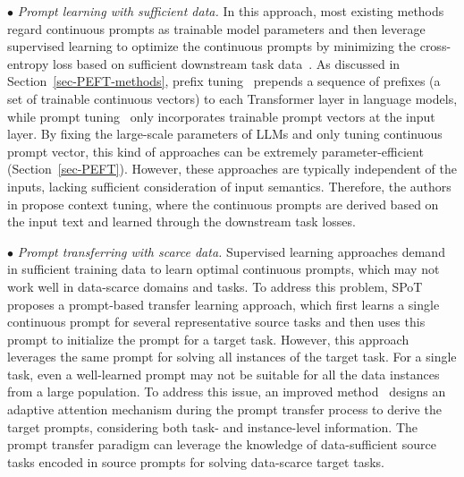 $\bullet$ {\textit{Prompt learning  with sufficient data.} In this approach, most existing methods regard continuous prompts as trainable model parameters and then leverage supervised learning to optimize the continuous prompts by minimizing the cross-entropy loss based on sufficient downstream task data~\cite{Li-ACL-2021-prefix,Lester-ACL-2021-The,Tang-COLING-2022-Context,Liu-arXiv-2021-P-tuning}. As discussed in Section~\ref{sec-PEFT-methods}, prefix tuning~\cite{Li-ACL-2021-prefix} prepends a sequence of prefixes (\ie a set of trainable continuous vectors) to each Transformer layer in language models, while prompt tuning~\cite{Lester-ACL-2021-The} only incorporates trainable prompt vectors at the input layer. By fixing the large-scale parameters of LLMs and only tuning continuous prompt vector, this kind of approaches can be extremely parameter-efficient (Section~\ref{sec-PEFT}). However, these approaches are typically independent of the inputs, lacking sufficient consideration of input semantics. Therefore, the authors in \cite{Tang-COLING-2022-Context} propose context tuning, where the continuous prompts are derived based on the input text and learned through the downstream task losses.}


$\bullet$  {\textit{Prompt transferring  with scarce data.} Supervised learning approaches demand in sufficient training data to learn optimal continuous prompts, which may not work well in data-scarce domains and tasks. To address this problem, SPoT~\cite{Vu-ACL-2022-SPoT} proposes a prompt-based transfer learning approach, which first learns  %
{a single continuous prompt} for several representative source tasks and then uses this prompt to initialize the prompt for a target task.  {However, this approach leverages the same prompt for solving all instances of the target task. For a single task, even a well-learned prompt may not be suitable for all the data instances from a large population.} To address this issue, an improved method~\cite{Li-NAACL-2022-Learning} designs an adaptive attention mechanism during the prompt transfer process to derive the target prompts,  considering both task- and instance-level information.  %
{The prompt transfer paradigm can leverage the knowledge of data-sufficient source tasks encoded in source prompts for  solving  data-scarce target tasks.}
}